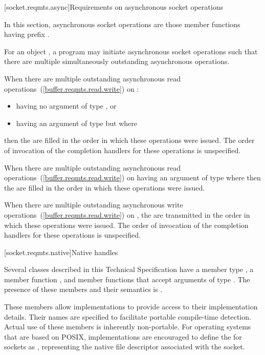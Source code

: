 [socket.reqmts.async]{Requirements on asynchronous socket operations}

\pnum
In this section, asynchronous socket operations are those member functions having prefix .

\pnum
For an object , a program may initiate asynchronous socket operations such that there are multiple simultaneously outstanding asynchronous operations.

\pnum
When there are multiple outstanding asynchronous read operations~(\ref{buffer.reqmts.read.write}) on :

\begin{itemize}
\item
having no argument  of type , or
\item
having an argument  of type  but where 
\end{itemize}

then the  are filled in the order in which these operations were issued. The order of invocation of the completion handlers for these operations is unspecified.

\pnum
When there are multiple outstanding asynchronous read operations~(\ref{buffer.reqmts.read.write}) on  having an argument  of type  where  then the  are filled in the order in which these operations were issued.

\pnum
When there are multiple outstanding asynchronous write operations~(\ref{buffer.reqmts.read.write}) on , the  are transmitted in the order in which these operations were issued. The order of invocation of the completion handlers for these operations is unspecified.



[socket.reqmts.native]{Native handles}

\pnum
Several classes described in this Technical Specification have a member type , a member function , and member functions that accept arguments of type . The presence of these members and their semantics is
.

\pnum
\enternote These members allow implementations to provide access to their implementation details. Their names are specified to facilitate portable compile-time detection. Actual use of these members is inherently non-portable. For operating systems that are based on POSIX, implementations are encouraged to define the  for sockets as , representing the native file descriptor associated with the socket. \exitnote



